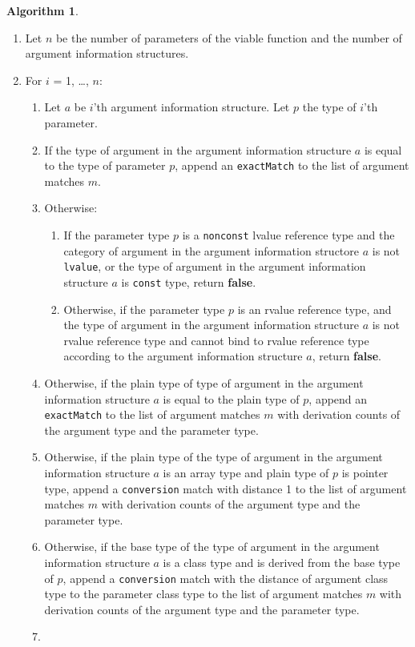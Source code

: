 \documentclass[a4paper,oneside,11pt]{book}
\theoremstyle{definition}
\newtheorem{algo}{Algorithm}[section]
\begin{document}
\begin{algo}
\begin{enumerate}
\item
Let $n$ be the number of parameters of the viable function and the number of argument information structures.
\item
For $i$ = 1, \ldots, $n$:
\begin{enumerate}
\item
Let $a$ be $i$'th argument information structure. Let $p$ the type of $i$'th parameter.
\item
If the type of argument in the argument information structure $a$ is equal to the type of parameter $p$,
append an \verb|exactMatch| to the list of argument matches $m$.
\item
Otherwise:
\begin{enumerate}
\item
If the parameter type $p$ is a \verb|nonconst| lvalue reference type and the category of argument in the argument information structore $a$ is not \verb|lvalue|,
or the type of argument in the argument information structure $a$ is \verb|const| type, return \textbf{false}.
\item
Otherwise, if the parameter type $p$ is an rvalue reference type,
and the type of argument in the argument information structure $a$ is not rvalue reference type and
cannot bind to rvalue reference type according to the argument information structure $a$, return \textbf{false}.
\end{enumerate}
\item
Otherwise, if the plain type of type of argument in the argument information structure $a$ is equal to the plain type of $p$,
append an \verb|exactMatch| to the list of argument matches $m$ with derivation counts of the argument type and the parameter type.
\item
Otherwise, if the plain type of the type of argument in the argument information structure $a$ is an array type and plain type of $p$ is pointer type,
append a \verb|conversion| match with distance 1 to the list of argument matches $m$ with derivation counts of the argument type and the parameter type.
\item
Otherwise, if the base type of the type of argument in the argument information structure $a$ is a class type and is derived from the base type of $p$,
append a \verb|conversion| match with the distance of argument class type to the parameter class type to the list of argument matches $m$
with derivation counts of the argument type and the parameter type.
\item

\end{enumerate}
\end{enumerate}
\end{algo}
\end{document}
